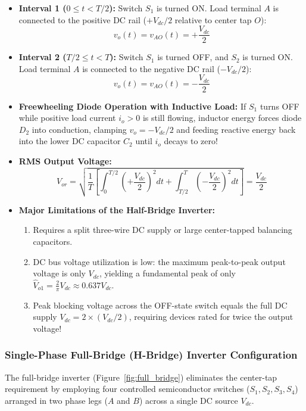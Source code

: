 \documentclass[11pt,a4paper]{article}
\begin{document}
\begin{itemize}[leftmargin=*]
  \item \textbf{Interval 1 ($0 \le t < T/2$):} Switch $S_1$ is turned ON. Load terminal $A$ is connected to the positive DC rail ($+V_{dc}/2$ relative to center tap $O$):
  \begin{equation}
  v_o(t) = v_{AO}(t) = +\frac{V_{dc}}{2}
  \end{equation}
  \item \textbf{Interval 2 ($T/2 \le t < T$):} Switch $S_1$ is turned OFF, and $S_2$ is turned ON. Load terminal $A$ is connected to the negative DC rail ($-V_{dc}/2$):
  \begin{equation}
  v_o(t) = v_{AO}(t) = -\frac{V_{dc}}{2}
  \end{equation}
  \item \textbf{Freewheeling Diode Operation with Inductive Load:} If $S_1$ turns OFF while positive load current $i_o > 0$ is still flowing, inductor energy forces diode $D_2$ into conduction, clamping $v_o = -V_{dc}/2$ and feeding reactive energy back into the lower DC capacitor $C_2$ until $i_o$ decays to zero!
  \item \textbf{RMS Output Voltage:}
  \begin{equation}
  V_{or} = \sqrt{\frac{1}{T}\left[ \int_0^{T/2} \left(+\frac{V_{dc}}{2}\right)^2 dt + \int_{T/2}^T \left(-\frac{V_{dc}}{2}\right)^2 dt \right]} = \frac{V_{dc}}{2}
  \end{equation}
  \item \textbf{Major Limitations of the Half-Bridge Inverter:}
  \begin{enumerate}
    \item Requires a split three-wire DC supply or large center-tapped balancing capacitors.
    \item DC bus voltage utilization is low: the maximum peak-to-peak output voltage is only $V_{dc}$, yielding a fundamental peak of only $\hat{V}_{o1} = \frac{2}{\pi}V_{dc} \approx 0.637 V_{dc}$.
    \item Peak blocking voltage across the OFF-state switch equals the full DC supply $V_{dc} = 2 \times (V_{dc}/2)$, requiring devices rated for twice the output voltage!
  \end{enumerate}
\end{itemize}

\subsubsection{Single-Phase Full-Bridge (H-Bridge) Inverter Configuration}
The full-bridge inverter (Figure~\ref{fig:full_bridge}) eliminates the center-tap requirement by employing four controlled semiconductor switches ($S_1, S_2, S_3, S_4$) arranged in two phase legs ($A$ and $B$) across a single DC source $V_{dc}$.
\end{document}
